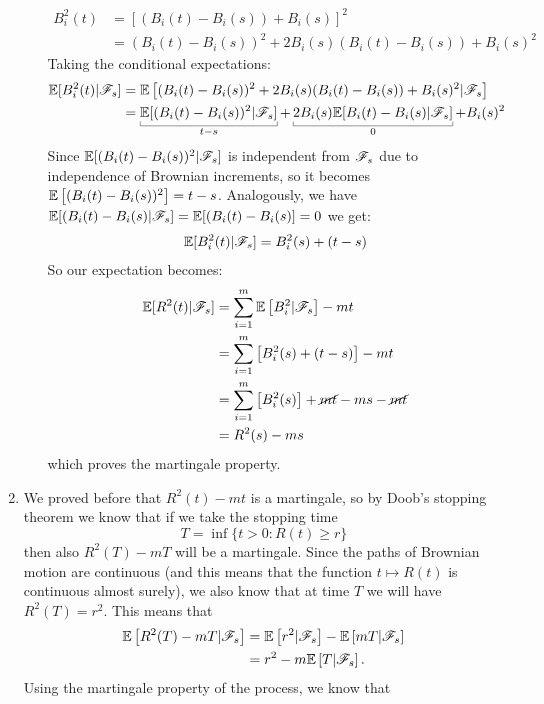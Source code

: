 \documentclass[12pt]{article}
\begin{document}
\begin{enumerate}
\begin{enumerate}
\begin{align*}
				B_i^2(t) &= [(B_i(t) - B_i(s)) + B_i(s)]^2\\ &= (B_i(t) - B_i(s))^2 + 2B_i(s)(B_i(t)-B_i(s)) + B_i(s)^2
			\end{align*}
			Taking the conditional expectations:
			\begin{align*}
				\ev[B_i^2(t)|\F_s]&=\ev\left[(B_i(t) - B_i(s))^2 + 2B_i(s)(B_i(t)-B_i(s)) + B_i(s)^2|\F_s\right]\\&=\ubracketthin{\ev[(B_i(t) - B_i(s))^2|\F_s]}_{t-s}+\ubracketthin{2B_i(s)\ev[B_i(t) - B_i(s)|\F_s]}_{0} + B_i(s)^2\\
			\end{align*}
			Since $\mathbb{E}[(B_i(t) - B_i(s))^2|\mathscr{F}_s]$ is independent from $\mathscr{F}_s$ due to independence of Brownian increments, so it becomes $\mathbb{E}\left[(B_i(t) - B_i(s))^2\right] = t-s$. Analogously, we have $\mathbb{E}[(B_i(t) - B_i(s)|\mathscr{F}_s]=\mathbb{E}[(B_i(t) - B_i(s)]= 0$ we get:
			\begin{align*}
				\mathbb{E}[B_i^2(t)|\mathscr{F}_s] = B_i^2(s) + (t-s)
			\end{align*}
			So our expectation becomes:
			\begin{align*}
				\mathbb{E}[R^2(t)|\mathscr{F}_s] &=\sum_{i=1}^m\mathbb{E}\left[B_i^2|\mathscr{F}_s\right]-mt\\&= \sum_{i=1}^m \left[B_i^2(s) + (t-s)\right]-mt\\ 
				&=\sum_{i=1}^m \left[B_i^2(s)\right]+\cancel{mt}-ms-\cancel{mt}\\
				&= R^2(s) -ms
			\end{align*}
			which proves the martingale property.
		\end{enumerate}
		\item We proved before that $R^{2}(t)-mt$ is a martingale, so by Doob's stopping theorem we know that if we take the stopping time 
		\begin{equation*}
			T = \inf\{t > 0 : R(t) \geq r\}
		\end{equation*}
		then also $R^{2}(T) -mT$ will be a martingale. Since the paths of Brownian motion are continuous (and this means that the function $t\mapsto R(t)$ is continuous almost surely), we also know that at time $T$ we will have $R^2(T)=r^{2}$. This means that 
		\begin{align*}
			\mathbb{E}\left[R^2(T)-mT|\mathscr{F}_{s}\right]&=\mathbb{E}\left[r^{2}|\mathscr{F}_{s}\right]-\mathbb{E}\left[mT|\mathscr{F}_{s}\right]\\
			&=r^{2}-m\mathbb{E}\left[T|\mathscr{F}_{s}\right].
		\end{align*}
		Using the martingale property of the process, we know that
		\begin{equation*}

\end{equation*}
\end{enumerate}
\end{document}
